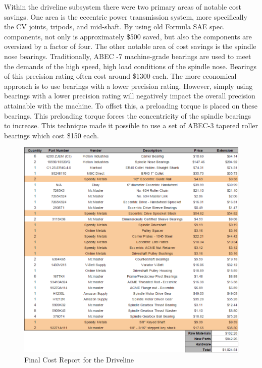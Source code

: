 Within the driveline subsystem there were two primary areas of notable cost savings. One area is the eccentric power transmission system, more specifically the CV joints, tripods, and mid-shaft. By using old Formula SAE spec. components, not only is approximately \$500 saved, but also the components are oversized by a factor of four. The other notable area of cost savings is the spindle nose bearings. Traditionally, ABEC -7 machine-grade bearings are used to meet the demands of the high speed, high load conditions of the spindle nose. Bearings of this precision rating often cost around \$1300 each.  The more economical approach is to use bearings with a lower precision rating. However, simply using bearings with a lower precision rating will negatively impact the overall precision attainable with the machine. To offset this, a preloading torque is placed on these bearings. This preloading torque forces the concentricity of the spindle bearings to increase. This technique made it possible to use a set of ABEC-3 tapered roller bearings which cost \$150 each. 

\begin{figure}[htp]
    \centering
    \includegraphics[width=1.0\textwidth]{./fall-report pictures/Chapter4-BillofMaterials/FCRD}
    \caption{Final Cost Report for the Driveline}
    \label{fig:CRD}
\end{figure}


